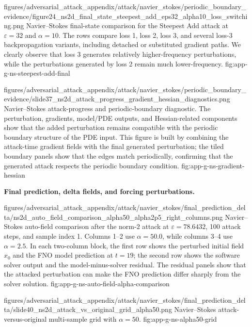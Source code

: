 \documentclass[letterpaper]{article} %
\begin{document}
\appendixattackfigfullportrait
  {figures/adversarial_attack_appendix/attack/navier_stokes/periodic_boundary_evidence/figure24_ns2d_final_state_steepest_add_eps32_alpha10_loss_switching.png}
  {Navier--Stokes final-state comparison for the Steepest Add attack at
  $\varepsilon=32$ and $\alpha=10$. The rows compare loss 1, loss 2, loss 3, and
  several loss-3 backpropagation variants, including detached or substituted
  gradient paths. We clearly observe that loss 3 generates relatively
  higher-frequency perturbations, while the perturbations generated by loss 2
  remain much lower-frequency.}
  {fig:app-g-ns-steepest-add-final}



\appendixattackfig
  {figures/adversarial_attack_appendix/attack/navier_stokes/periodic_boundary_evidence/slide37_ns2d_attack_progress_gradient_hessian_diagnostics.png}
  {Navier--Stokes attack-progress and periodic-boundary diagnostic. The
  perturbation, gradients, model/PDE outputs, and Hessian-related components
  show that the added perturbation remains compatible with the periodic boundary
  structure of the PDE input. This figure is built by combining the attack-time
  gradient fields with the final generated perturbation; the tiled boundary
  panels show that the edges match periodically, confirming that the generated
  attack respects the periodic boundary condition.}
  {fig:app-g-ns-gradient-hessian}

\noindent\textbf{Final prediction, delta fields, and forcing perturbations.}

\appendixattackfig
  {figures/adversarial_attack_appendix/attack/navier_stokes/final_prediction_delta/ns2d_auto_field_comparison_alpha50_alpha2p5_right_columns.png}
  {Navier--Stokes auto-field comparison after the norm-$2$ attack at
  $\varepsilon=78.6432$, 100 attack steps, and sample index 1. Columns 1--2 use
  $\alpha=50.0$, while columns 3--4 use $\alpha=2.5$. In each two-column block,
  the first row shows the perturbed initial field $x_0$ and the FNO model
  prediction at $t=19$; the second row shows the software solver output and the
  model-minus-solver residual. The residual panels show that the attacked
  perturbation can make the FNO prediction differ sharply from the solver
  solution.}
  {fig:app-g-ns-auto-field-alpha-comparison}

\appendixattackfig
  {figures/adversarial_attack_appendix/attack/navier_stokes/final_prediction_delta/slide40_ns2d_attack_vs_original_grid_alpha50.png}
  {Navier--Stokes attack-versus-original multi-sample grid with $\alpha=50$.}
  {fig:app-g-ns-alpha50-grid}
\end{document}
